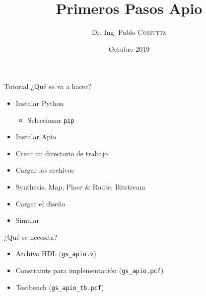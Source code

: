 \documentclass{beamer}
\title[Primeros Pasos]{Primeros Pasos Apio}
\subtitle{}
\author{Dr. Ing. Pablo \textsc{Cossutta}}
\date{Octubre 2019}
\begin{document}
\beamertemplatenavigationsymbolsempty %
\maketitle
\logo{}

\begin{frame}{Tutorial}
¿Qué se va a hacer?
\begin{itemize}
	\item Instalar Python
	\begin{itemize}
		\item Seleccionar \texttt{pip}
	\end{itemize}
	\item Instalar Apio
	\item Crear un directorio de trabajo
	\item Cargar los archivos
	\item Synthesis, Map, Place \& Route, Bitstream
	\item Cargar el diseño
	\item Simular
\end{itemize}
¿Qué se necesita?
\begin{itemize}
	\item Archivo HDL (\texttt{gs\_apio.v})
	\item Constraints para implementación (\texttt{gs\_apio.pcf})	
	\item Testbench (\texttt{gs\_apio\_tb.pcf})	
\end{itemize}
\end{frame}
    
\end{document}
